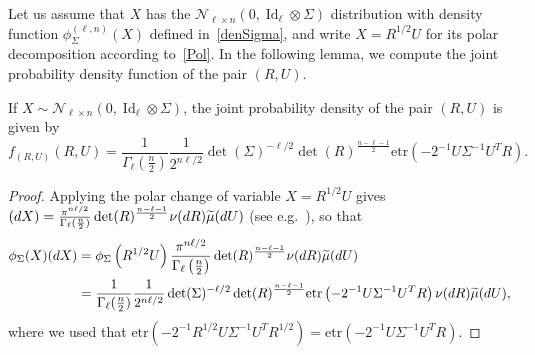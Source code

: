 \documentclass[AHL,Unicode,longabstracts,published]{cedram}
\DeclareMathOperator{\Id}{Id}
\newcommand{\scN}{\mathscr{N}}
\newcommand{\etr}[1]{\mathrm{etr}\left(#1\right)}
\let\oldtilde\tilde
\renewcommand*{\tilde}[1]{\mathchoice{\widetilde{#1}}{\widetilde{#1}}{\oldtilde{#1}}{\oldtilde{#1}}}
\begin{document}
Let us assume that $X$ has the $\scN_{\ell \times n}(0,\Id_{\ell} \otimes \Sigma)$ distribution with density function $\phi_{\Sigma}^{(\ell,n)}(X)$ defined in~\eqref{denSigma}, and write $X=R^{1/2}U$ for its polar decomposition according to~\eqref{Pol}. In the following lemma, we compute the joint probability density function of the pair $(R,U)$.
\begin{lemm}
If $X \sim \scN_{\ell \times n}(0,\Id_{\ell} \otimes \Sigma)$, the joint probability density of the pair $(R,U)$ is given by
\begin{equation}\label{denMU}
f_{(R,U)}(R,U) = \frac{1}{\Gamma_{\ell}\left(\frac{n}{2}\right)}
\frac{1}{2^{n\ell/2}} \det(\Sigma)^{-\ell/2} \det(R)^{\frac{n-\ell-1}{2}}
\etr{ -2^{-1}U\Sigma^{-1}U^TR}.
\end{equation}
\end{lemm}

\begin{proof}
Applying the polar change of variable $X=R^{1/2}U$ gives $(dX) = \frac{\pi^{n\ell/2}}{\Gamma_{\ell}(\frac{n}{2})}\linebreak
\det(R)^{\frac{n-\ell-1}{2}} \nu(dR) \tilde{\mu}(dU)$ (see e.g.~\cite[Theorem~1.5.2]{Ch2012}), so that
\begin{align*}
\phi_{\Sigma}(X)(dX) &= \phi_{\Sigma}\left(R^{1/2}U\right) \frac{\pi^{n\ell/2}}{\Gamma_{\ell}\left(\frac{n}{2}\right)}
\det(R)^{\frac{n-\ell-1}{2}} \nu(dR) \tilde{\mu}(dU)\\
&= \frac{1}{\Gamma_{\ell}(\frac{n}{2})}
\frac{1}{2^{n\ell/2}} \det(\Sigma)^{-\ell/2} \det(R)^{\frac{n-\ell-1}{2}}
\etr{ -2^{-1}U\Sigma^{-1}U^TR}\nu(dR) \tilde{\mu}(dU),
\end{align*}
where we used that $\mathrm{etr}(-2^{-1}R^{1/2}U\Sigma^{-1}U^{T}R^{1/2})=\mathrm{etr}( -2^{-1}U\Sigma^{-1}U^TR)$.
\end{proof}
\end{document}
